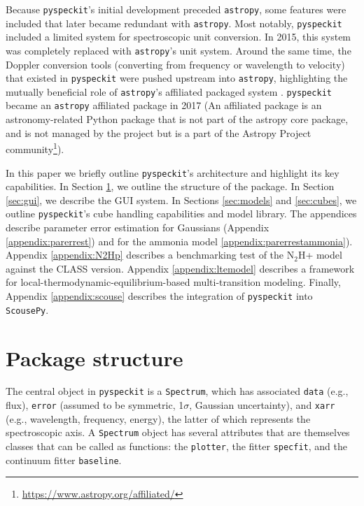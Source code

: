 \documentclass[twocolumn]{aastex63}
\newcommand{\pyspeckit}{\texttt{pyspeckit}\xspace}
\newcommand{\astropy}{\texttt{astropy}\xspace}
\begin{document}
Because \pyspeckit's initial development preceded \astropy, some features
were included that later became redundant with \astropy.  Most notably, \pyspeckit included
a limited system for spectroscopic unit conversion.  In 2015, this system
was completely replaced with \astropy's unit system.  Around the same time,
the Doppler conversion tools (converting from frequency or wavelength to
velocity) that existed in \pyspeckit were pushed upstream into \astropy,
highlighting the mutually beneficial role of \astropy's affiliated
packaged system \citep{AstropyCollaboration2018}.  \pyspeckit became
an \astropy affiliated package in 2017 (An affiliated package is an astronomy-related Python package that is not part of the astropy core package, and is not managed by the project but is a part of the Astropy Project community\footnote{\url{https://www.astropy.org/affiliated/}}).


In this paper we briefly outline \texttt{pyspeckit}'s architecture and highlight
its key capabilities. In Section \ref{sec:basicstructure}, we  outline the
structure of the package.  In Section \ref{sec:gui}, we describe the GUI
system.  In Sections \ref{sec:models} and \ref{sec:cubes}, we outline
\pyspeckit's cube handling capabilities and model library. 
The appendices describe parameter error estimation for Gaussians (Appendix \ref{appendix:parerrest}) and for the ammonia model \ref{appendix:parerrestammonia}).
Appendix \ref{appendix:N2Hp} describes a benchmarking test of the N$_2$H+ model against the CLASS version.
Appendix \ref{appendix:ltemodel} describes a framework for local-thermodynamic-equilibrium-based multi-transition modeling.
Finally, Appendix \ref{appendix:scouse} describes the integration of \texttt{pyspeckit} into \texttt{ScousePy}.



\section{Package structure}
\label{sec:basicstructure}
The central object in \pyspeckit is a \texttt{Spectrum}, which has
associated \texttt{data} (e.g., flux), \texttt{error} (assumed to be symmetric, 1$\sigma$, Gaussian uncertainty), and \texttt{xarr} (e.g., wavelength,
frequency, energy), the latter of
which represents the spectroscopic axis.  A \texttt{Spectrum} object has
several attributes that are themselves classes that can be called
as functions: the \texttt{plotter}, the fitter \texttt{specfit}, and the
continuum fitter \texttt{baseline}.
\end{document}
